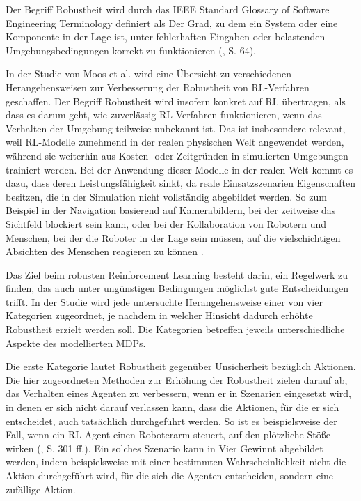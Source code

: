 \label{robustheit}

Der Begriff Robustheit wird durch das IEEE Standard Glossary of Software Engineering Terminology definiert als \glqq Der Grad, zu dem ein System oder eine Komponente in der Lage ist, unter fehlerhaften Eingaben oder belastenden Umgebungsbedingungen korrekt zu funktionieren\grqq{} (\cite{IEEE.1990}, S. 64).

In der Studie von Moos et al. wird eine Übersicht zu verschiedenen Herangehensweisen zur Verbesserung der Robustheit von RL-Verfahren geschaffen. Der Begriff Robustheit wird insofern konkret auf RL übertragen, als dass es darum geht, wie zuverlässig RL-Verfahren funktionieren, wenn das Verhalten der Umgebung teilweise unbekannt ist. Das ist insbesondere relevant, weil RL-Modelle zunehmend in der realen physischen Welt angewendet werden, während sie weiterhin aus Kosten- oder Zeitgründen in simulierten Umgebungen trainiert werden. Bei der Anwendung dieser Modelle in der realen Welt kommt es dazu, dass deren Leistungsfähigkeit sinkt, da reale Einsatzszenarien Eigenschaften besitzen, die in der Simulation nicht vollständig abgebildet werden. So zum Beispiel in der Navigation basierend auf Kamerabildern, bei der zeitweise das Sichtfeld blockiert sein kann, oder bei der Kollaboration von Robotern und Menschen, bei der die Roboter in der Lage sein müssen, auf die vielschichtigen Absichten des Menschen reagieren zu können \cite{Moos.2022} \cite{Ni.2021}.

Das Ziel beim robusten Reinforcement Learning besteht darin, ein Regelwerk zu finden, das auch unter ungünstigen Bedingungen möglichst gute Entscheidungen trifft. In der Studie wird jede untersuchte Herangehensweise einer von vier Kategorien zugeordnet, je nachdem in welcher Hinsicht dadurch erhöhte Robustheit erzielt werden soll. Die Kategorien betreffen jeweils unterschiedliche Aspekte des modellierten MDPs.

Die erste Kategorie lautet Robustheit gegenüber Unsicherheit bezüglich Aktionen. Die hier zugeordneten Methoden zur Erhöhung der Robustheit zielen darauf ab, das Verhalten eines Agenten zu verbessern, wenn er in Szenarien eingesetzt wird, in denen er sich nicht darauf verlassen kann, dass die Aktionen, für die er sich entscheidet, auch tatsächlich durchgeführt werden. So ist es beispielsweise der Fall, wenn ein RL-Agent einen Roboterarm steuert, auf den plötzliche Stöße wirken (\cite{Moos.2022}, S. 301 ff.). Ein solches Szenario kann in Vier Gewinnt abgebildet werden, indem beispielsweise mit einer bestimmten Wahrscheinlichkeit nicht die Aktion durchgeführt wird, für die sich die Agenten entscheiden, sondern eine zufällige Aktion.

